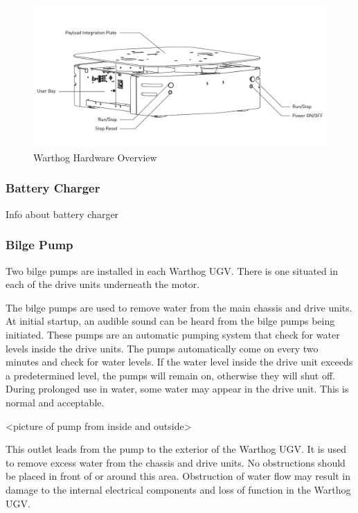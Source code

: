 \documentclass[]{clearpath-latex/clearpath-manual}
\begin{document}
\begin{figure}[h]
  \centering
  \includegraphics[width=1\linewidth]{Warthog_Rear_Drawing_Labeled.pdf}
  \caption{Warthog Hardware Overview}
  \label{Warthog_overview}
\end{figure}





\pagebreak[4]
\subsubsection{Battery Charger}
Info about battery charger

\subsubsection{Bilge Pump}
Two bilge pumps are installed in each Warthog UGV. There is one situated in each of the drive units underneath the motor.

The bilge pumps are used to remove water from the main chassis and drive units. At initial startup, an audible sound can be heard from the bilge pumps being initiated. These pumps are an automatic pumping system that check for water levels inside the drive units. The pumps automatically come on every two minutes and check for water levels. If the water level inside the drive unit exceeds a predetermined level, the pumps will remain on, otherwise they will shut off. During prolonged use in water, some water may appear in the drive unit. This is normal and acceptable.

<picture of pump from inside and outside>

This outlet leads from the pump to the exterior of the Warthog UGV. It is used to remove excess water from the chassis and drive units. No obstructions should be placed in front of or around this area. Obstruction of water flow may result in damage to the internal electrical components and loss of function in the Warthog UGV.
\end{document}
